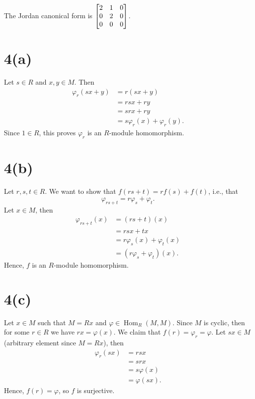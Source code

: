 \documentclass[12pt]{article}
\theoremstyle{definition}
\renewcommand{\phi}{\varphi}
\DeclareMathOperator{\Hom}{Hom}
\begin{document}
The Jordan canonical form is $\mqty[2 & 1 & 0\\ 0 & 2 & 0 \\ 0 & 0 & 0]$.



\newpage
\section*{4(a)}

Let $s \in R$ and $x, y \in M$. Then
\begin{align*}
    \phi_r(sx + y)
        &= r(sx + y) \\
        &= rsx + ry \\
        &= srx + ry \\
        &= s\phi_r(x) + \phi_r(y).
\end{align*}
Since $1 \in R$, this proves $\phi_r$ is an $R$-module homomorphism.

\section*{4(b)}

Let $r, s, t \in R$. We want to show that $f(rs + t) = rf(s) + f(t)$, i.e., that
\[
    \phi_{rs + t} = r\phi_s + \phi_t.
\]
Let $x \in M$, then
\begin{align*}
    \phi_{rs + t}(x)
        &= (rs + t)(x) \\
        &= rsx + tx \\
        &= r\phi_s(x) + \phi_t(x) \\
        &= (r\phi_s + \phi_t)(x).
\end{align*}
Hence, $f$ is an $R$-module homomorphism.

\section*{4(c)}

Let $x \in M$ such that $M = Rx$ and $\phi \in \Hom_R(M, M)$. Since $M$ is cyclic, then for some $r \in R$ we have $rx = \phi(x)$. We claim that $f(r) = \phi_r = \phi$. Let $sx \in M$ (arbitrary element since $M = Rx$), then
\begin{align*}
    \phi_r(sx)
        &= rsx \\
        &= srx \\
        &= s\phi(x) \\
        &= \phi(sx).
\end{align*}
Hence, $f(r) = \phi$, so $f$ is surjective.
\end{document}
